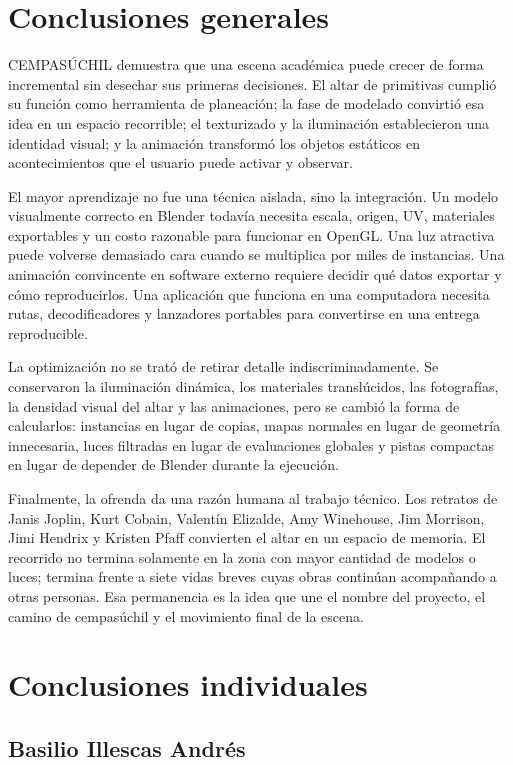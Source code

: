 \documentclass[letter,12pt]{article}
\begin{document}
	\section{Conclusiones generales}
	CEMPASÚCHIL demuestra que una escena académica puede crecer de forma incremental sin desechar sus primeras decisiones. El altar de primitivas cumplió su función como herramienta de planeación; la fase de modelado convirtió esa idea en un espacio recorrible; el texturizado y la iluminación establecieron una identidad visual; y la animación transformó los objetos estáticos en acontecimientos que el usuario puede activar y observar.

	El mayor aprendizaje no fue una técnica aislada, sino la integración. Un modelo visualmente correcto en Blender todavía necesita escala, origen, UV, materiales exportables y un costo razonable para funcionar en OpenGL. Una luz atractiva puede volverse demasiado cara cuando se multiplica por miles de instancias. Una animación convincente en software externo requiere decidir qué datos exportar y cómo reproducirlos. Una aplicación que funciona en una computadora necesita rutas, decodificadores y lanzadores portables para convertirse en una entrega reproducible.

	La optimización no se trató de retirar detalle indiscriminadamente. Se conservaron la iluminación dinámica, los materiales translúcidos, las fotografías, la densidad visual del altar y las animaciones, pero se cambió la forma de calcularlos: instancias en lugar de copias, mapas normales en lugar de geometría innecesaria, luces filtradas en lugar de evaluaciones globales y pistas compactas en lugar de depender de Blender durante la ejecución.

	Finalmente, la ofrenda da una razón humana al trabajo técnico. Los retratos de Janis Joplin, Kurt Cobain, Valentín Elizalde, Amy Winehouse, Jim Morrison, Jimi Hendrix y Kristen Pfaff convierten el altar en un espacio de memoria. El recorrido no termina solamente en la zona con mayor cantidad de modelos o luces; termina frente a siete vidas breves cuyas obras continúan acompañando a otras personas. Esa permanencia es la idea que une el nombre del proyecto, el camino de cempasúchil y el movimiento final de la escena.

\section{Conclusiones individuales}

\subsection*{Basilio Illescas Andrés}
\end{document}
